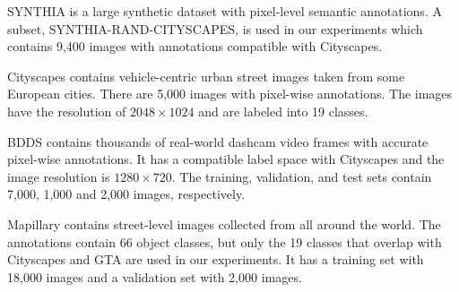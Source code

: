 \documentclass[10pt,twocolumn,letterpaper]{article}
\begin{document}
SYNTHIA is a large synthetic dataset with pixel-level semantic annotations. A subset, SYNTHIA-RAND-CITYSCAPES, is used in our experiments which contains 9,400 images with annotations compatible with Cityscapes.

Cityscapes contains vehicle-centric urban street images taken from some European cities. There are 5,000 images with pixel-wise annotations. The images have the resolution of $2048 \times 1024$ and are labeled into 19 classes.




BDDS contains thousands of real-world dashcam video frames with accurate pixel-wise annotations. It has a compatible label space with Cityscapes and the image resolution is $1280 \times 720$. The training, validation, and test sets contain 7,000, 1,000 and 2,000 images, respectively.

Mapillary contains street-level images collected from all around the world.
The annotations contain 66 object classes, but only the 19 classes that overlap with Cityscapes and GTA are used in our experiments. It has a training set with 18,000 images and a validation set with 2,000 images. 
\label{para:experimental_setup}
\end{document}
